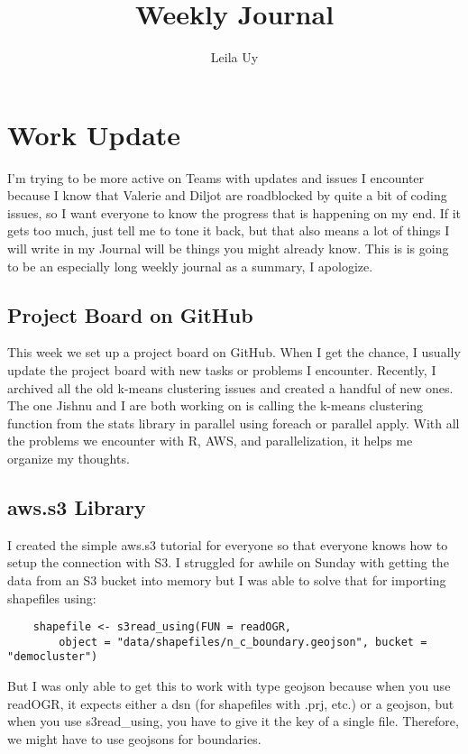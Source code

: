 \documentclass[a4paper,10pt]{article}
\title{Weekly Journal}
\author{Leila Uy}
\begin{document}
\maketitle

\section{Work Update}
I'm trying to be more active on Teams with updates and issues I encounter because I know that Valerie and Diljot are roadblocked by quite a bit of coding issues, so I want everyone to know the progress that is happening on my end. If it gets too much, just tell me to tone it back, but that also means a lot of things I will write in my Journal will be things you might already know. This is is going to be an especially long weekly journal as a summary, I apologize.


\subsection{Project Board on GitHub}
This week we set up a project board on GitHub. When I get the chance, I usually update the project board with new tasks or problems I encounter. Recently, I archived all the old k-means clustering issues and created a handful of new ones. The one Jishnu and I are both working on is calling the k-means clustering function from the stats library in parallel using foreach or parallel apply. With all the problems we encounter with R, AWS, and parallelization, it helps me organize my thoughts.

\subsection{aws.s3 Library}
I created the simple aws.s3 tutorial for everyone so that everyone knows how to setup the connection with S3. I struggled for awhile on Sunday with getting the data from an S3 bucket into memory but I was able to solve that for importing shapefiles using:
\begin{verbatim}
    shapefile <- s3read_using(FUN = readOGR, 
        object = "data/shapefiles/n_c_boundary.geojson", bucket = "democluster")
\end{verbatim}

But I was only able to get this to work with type geojson because when you use readOGR, it expects either a dsn (for shapefiles with .prj, etc.) or a geojson, but when you use s3read\_using, you have to give it the key of a single file. Therefore, we might have to use geojsons for boundaries.
\end{document}

